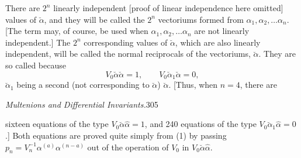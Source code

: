 \documentclass[11pt]{article}
\begin{document}
\indent There are $2^n$ linearly independent [proof of linear independence here omitted] values of $\breve\alpha$, and they will be called the $2^n$ vectoriums formed from $\alpha_1,\alpha_2,\ldots\alpha_n$. [The term may, of course, be used when $\alpha_1,\alpha_2,\ldots\alpha_n$ are not linearly independent.] The $2^n$ corresponding values of $\breve\alpha$, which are also linearly independent, will be called the normal reciprocals of the vectoriums, $\breve\alpha$. They are so called because
\[V_0\breve\alpha\breve\alpha=1,\qquad V_0\breve\alpha_1\breve\alpha=0,\]
$\breve\alpha_1$ being a second (not corresponding to $\breve\alpha$) $\breve\alpha$. [Thus, when $n=4$, there are

\newpage\thispagestyle{empty}\begin{center}\textit{Multenions and Differential Invariants.}\hfill 305\end{center}
sixteen equations of the type $V_0\breve\alpha\hat\alpha=1$, and 240 equations of the type $V_0\breve\alpha_1\hat\alpha=0$.] Both equations are proved quite simply from (1) by passing $p_n=V_n^{-1}\alpha^{(a)}\alpha^{(n-a)}$ out of the operation of $V_0$ in $V_0\breve\alpha\hat\alpha$.
\end{document}
